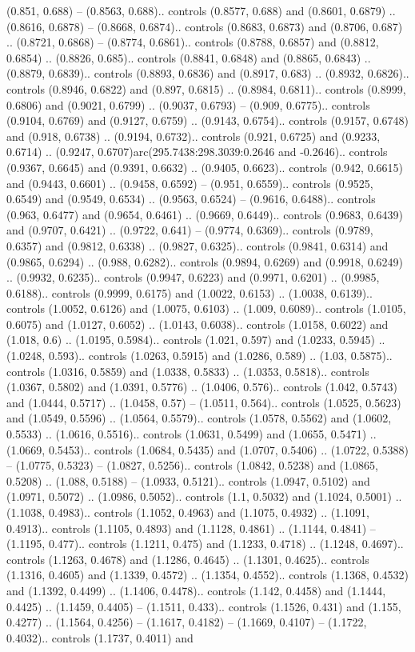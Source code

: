 (0.851, 0.688) -- (0.8563, 0.688).. controls (0.8577, 0.688) and (0.8601, 0.6879) .. (0.8616, 0.6878) -- (0.8668, 0.6874).. controls (0.8683, 0.6873) and (0.8706, 0.687) .. (0.8721, 0.6868) -- (0.8774, 0.6861).. controls (0.8788, 0.6857) and (0.8812, 0.6854) .. (0.8826, 0.685).. controls (0.8841, 0.6848) and (0.8865, 0.6843) .. (0.8879, 0.6839).. controls (0.8893, 0.6836) and (0.8917, 0.683) .. (0.8932, 0.6826).. controls (0.8946, 0.6822) and (0.897, 0.6815) .. (0.8984, 0.6811).. controls (0.8999, 0.6806) and (0.9021, 0.6799) .. (0.9037, 0.6793) -- (0.909, 0.6775).. controls (0.9104, 0.6769) and (0.9127, 0.6759) .. (0.9143, 0.6754).. controls (0.9157, 0.6748) and (0.918, 0.6738) .. (0.9194, 0.6732).. controls (0.921, 0.6725) and (0.9233, 0.6714) .. (0.9247, 0.6707)arc(295.7438:298.3039:0.2646 and -0.2646).. controls (0.9367, 0.6645) and (0.9391, 0.6632) .. (0.9405, 0.6623).. controls (0.942, 0.6615) and (0.9443, 0.6601) .. (0.9458, 0.6592) -- (0.951, 0.6559).. controls (0.9525, 0.6549) and (0.9549, 0.6534) .. (0.9563, 0.6524) -- (0.9616, 0.6488).. controls (0.963, 0.6477) and (0.9654, 0.6461) .. (0.9669, 0.6449).. controls (0.9683, 0.6439) and (0.9707, 0.6421) .. (0.9722, 0.641) -- (0.9774, 0.6369).. controls (0.9789, 0.6357) and (0.9812, 0.6338) .. (0.9827, 0.6325).. controls (0.9841, 0.6314) and (0.9865, 0.6294) .. (0.988, 0.6282).. controls (0.9894, 0.6269) and (0.9918, 0.6249) .. (0.9932, 0.6235).. controls (0.9947, 0.6223) and (0.9971, 0.6201) .. (0.9985, 0.6188).. controls (0.9999, 0.6175) and (1.0022, 0.6153) .. (1.0038, 0.6139).. controls (1.0052, 0.6126) and (1.0075, 0.6103) .. (1.009, 0.6089).. controls (1.0105, 0.6075) and (1.0127, 0.6052) .. (1.0143, 0.6038).. controls (1.0158, 0.6022) and (1.018, 0.6) .. (1.0195, 0.5984).. controls (1.021, 0.597) and (1.0233, 0.5945) .. (1.0248, 0.593).. controls (1.0263, 0.5915) and (1.0286, 0.589) .. (1.03, 0.5875).. controls (1.0316, 0.5859) and (1.0338, 0.5833) .. (1.0353, 0.5818).. controls (1.0367, 0.5802) and (1.0391, 0.5776) .. (1.0406, 0.576).. controls (1.042, 0.5743) and (1.0444, 0.5717) .. (1.0458, 0.57) -- (1.0511, 0.564).. controls (1.0525, 0.5623) and (1.0549, 0.5596) .. (1.0564, 0.5579).. controls (1.0578, 0.5562) and (1.0602, 0.5533) .. (1.0616, 0.5516).. controls (1.0631, 0.5499) and (1.0655, 0.5471) .. (1.0669, 0.5453).. controls (1.0684, 0.5435) and (1.0707, 0.5406) .. (1.0722, 0.5388) -- (1.0775, 0.5323) -- (1.0827, 0.5256).. controls (1.0842, 0.5238) and (1.0865, 0.5208) .. (1.088, 0.5188) -- (1.0933, 0.5121).. controls (1.0947, 0.5102) and (1.0971, 0.5072) .. (1.0986, 0.5052).. controls (1.1, 0.5032) and (1.1024, 0.5001) .. (1.1038, 0.4983).. controls (1.1052, 0.4963) and (1.1075, 0.4932) .. (1.1091, 0.4913).. controls (1.1105, 0.4893) and (1.1128, 0.4861) .. (1.1144, 0.4841) -- (1.1195, 0.477).. controls (1.1211, 0.475) and (1.1233, 0.4718) .. (1.1248, 0.4697).. controls (1.1263, 0.4678) and (1.1286, 0.4645) .. (1.1301, 0.4625).. controls (1.1316, 0.4605) and (1.1339, 0.4572) .. (1.1354, 0.4552).. controls (1.1368, 0.4532) and (1.1392, 0.4499) .. (1.1406, 0.4478).. controls (1.142, 0.4458) and (1.1444, 0.4425) .. (1.1459, 0.4405) -- (1.1511, 0.433).. controls (1.1526, 0.431) and (1.155, 0.4277) .. (1.1564, 0.4256) -- (1.1617, 0.4182) -- (1.1669, 0.4107) -- (1.1722, 0.4032).. controls (1.1737, 0.4011) and 